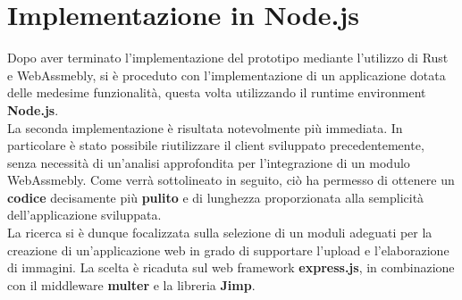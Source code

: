 \section{Implementazione in Node.js}
Dopo aver terminato l'implementazione del prototipo mediante l'utilizzo di Rust e WebAssmebly, si è proceduto con l'implementazione di un applicazione dotata delle medesime funzionalità, questa volta utilizzando il runtime environment \textbf{Node.js}.
\\La seconda implementazione è risultata notevolmente più immediata.
In particolare è stato possibile riutilizzare il client sviluppato precedentemente, senza necessità di un'analisi approfondita per l'integrazione di un modulo WebAssmebly.
Come verrà sottolineato in seguito, ciò ha permesso di ottenere un \textbf{codice} decisamente più \textbf{pulito} e di lunghezza proporzionata alla semplicità dell'applicazione sviluppata.
\\La ricerca si è dunque focalizzata sulla selezione di un moduli adeguati per la creazione di un'applicazione web in grado di supportare l'upload e l'elaborazione di immagini.
La scelta è ricaduta sul web framework \textbf{express.js}, in combinazione con il middleware \textbf{multer} e la libreria \textbf{Jimp}.
